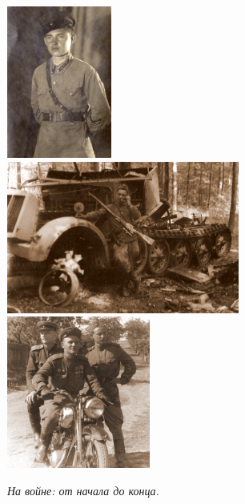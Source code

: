 \documentclass[utf8x, 12pt]{G7-32a} %
\begin{document}
\vspace{5pt}

\begin{figure}[h!]
    \begin{minipage}[h!]{45mm}
         \vspace{10pt}
         \begin{center}
         \vspace{-15pt}
         \includegraphics[height=50mm]{inc/Varzar/41.jpg} 
         \end{center}
         \vspace{-10pt}
    \end{minipage}
    \hfill
   \begin{minipage}[h]{65mm}
       \begin{center}
       \includegraphics[height=50mm]{inc/Varzar/42.jpg} 
       \end{center}
   \end{minipage}
   \hfill
    \begin{minipage}[h!]{45mm}
        \begin{center}
        \includegraphics[height=50mm]{inc/Varzar/43a.jpg}
        \end{center}
    \end{minipage}
    
    \itshape{На войне: от начала до конца.}
\end{figure}

\vspace{-20pt}


\mainmatter %



\backmatter %



\appendix   %
\end{document}

